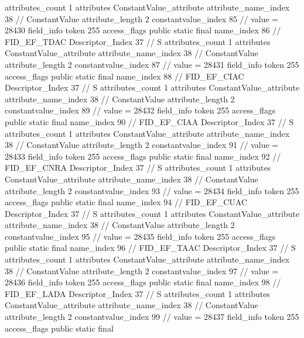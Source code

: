 {{{{{				attributes_count	1
				attributes {
				ConstantValue_attribute {
					attribute_name_index	38		// ConstantValue
					attribute_length	2
					constantvalue_index	85		// value = 28430
				}
				}
			}
			field_info {
				token	255
				access_flags	public static final
				name_index	86		// FID_EF_TDAC
				Descriptor_Index	37		// S
				attributes_count	1
				attributes {
				ConstantValue_attribute {
					attribute_name_index	38		// ConstantValue
					attribute_length	2
					constantvalue_index	87		// value = 28431
				}
				}
			}
			field_info {
				token	255
				access_flags	public static final
				name_index	88		// FID_EF_CIAC
				Descriptor_Index	37		// S
				attributes_count	1
				attributes {
				ConstantValue_attribute {
					attribute_name_index	38		// ConstantValue
					attribute_length	2
					constantvalue_index	89		// value = 28432
				}
				}
			}
			field_info {
				token	255
				access_flags	public static final
				name_index	90		// FID_EF_CIAA
				Descriptor_Index	37		// S
				attributes_count	1
				attributes {
				ConstantValue_attribute {
					attribute_name_index	38		// ConstantValue
					attribute_length	2
					constantvalue_index	91		// value = 28433
				}
				}
			}
			field_info {
				token	255
				access_flags	public static final
				name_index	92		// FID_EF_CNRA
				Descriptor_Index	37		// S
				attributes_count	1
				attributes {
				ConstantValue_attribute {
					attribute_name_index	38		// ConstantValue
					attribute_length	2
					constantvalue_index	93		// value = 28434
				}
				}
			}
			field_info {
				token	255
				access_flags	public static final
				name_index	94		// FID_EF_CUAC
				Descriptor_Index	37		// S
				attributes_count	1
				attributes {
				ConstantValue_attribute {
					attribute_name_index	38		// ConstantValue
					attribute_length	2
					constantvalue_index	95		// value = 28435
				}
				}
			}
			field_info {
				token	255
				access_flags	public static final
				name_index	96		// FID_EF_TAAC
				Descriptor_Index	37		// S
				attributes_count	1
				attributes {
				ConstantValue_attribute {
					attribute_name_index	38		// ConstantValue
					attribute_length	2
					constantvalue_index	97		// value = 28436
				}
				}
			}
			field_info {
				token	255
				access_flags	public static final
				name_index	98		// FID_EF_LADA
				Descriptor_Index	37		// S
				attributes_count	1
				attributes {
				ConstantValue_attribute {
					attribute_name_index	38		// ConstantValue
					attribute_length	2
					constantvalue_index	99		// value = 28437
				}
				}
			}
			field_info {
				token	255
				access_flags	public static final
}}}}}
